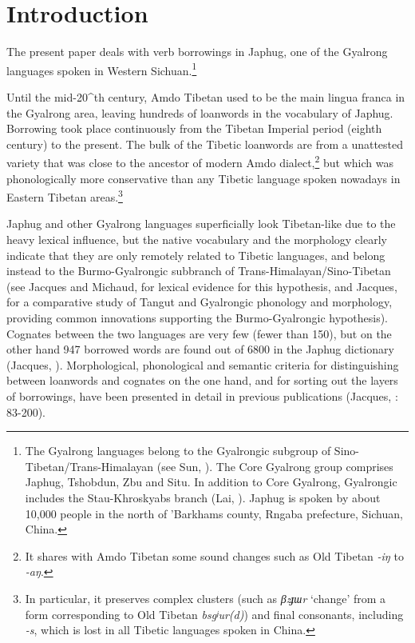 \documentclass[oneside,a4paper,11pt]{article}
\newcommand{\ipa}[1]{{\phon\textit{\mbox{#1}}}} %
\begin{document}
\section{Introduction}
The present paper deals with verb borrowings in Japhug, one of the Gyalrong languages spoken in Western Sichuan.\footnote{The Gyalrong languages belong to the Gyalrongic subgroup of Sino-Tibetan/Trans-Himalayan (see Sun, \citeyear{jackson00puxi}). The Core Gyalrong group comprises Japhug, Tshobdun, Zbu and Situ. In addition to Core Gyalrong, Gyalrongic includes the Stau-Khroskyabs branch (Lai, \citeyear{lai15person}). Japhug is spoken by about 10,000 people in the north of 'Barkhams county, Rngaba prefecture, Sichuan, China. } 

Until the mid-20^{th} century, Amdo Tibetan used to be the main lingua franca in the Gyalrong area, leaving hundreds of loanwords in the vocabulary of Japhug. Borrowing took place continuously from the Tibetan Imperial period (eighth century) to the present. The bulk of the Tibetic loanwords are from a unattested variety that was close to the ancestor of modern Amdo dialect,\footnote{It shares with Amdo Tibetan some sound changes such as Old Tibetan \ipa{-iŋ} to \ipa{-aŋ}. } but which was phonologically more conservative than any Tibetic language spoken nowadays in Eastern Tibetan areas.\footnote{In particular, it preserves complex clusters (such as \ipa{βzɟɯr} `change' from a form corresponding to Old Tibetan \ipa{bsgʲur(d)}) and final consonants, including \ipa{-s}, which is lost in all Tibetic languages spoken in China.} 

Japhug and other Gyalrong languages superficially look Tibetan-like due to the heavy lexical influence, but the native vocabulary and the morphology clearly indicate that they are only remotely related to Tibetic languages, and belong instead to the Burmo-Gyalrongic subbranch of Trans-Himalayan/Sino-Tibetan (see Jacques and Michaud, \citeyear{jacques.michaud11naish} for lexical evidence for this hypothesis, and Jacques, \citeyear{jacques14esquisse} for a comparative study of Tangut and Gyalrongic phonology and morphology, providing common innovations supporting the Burmo-Gyalrongic hypothesis). Cognates between the two languages are very few (fewer than 150), but on the other hand 947 borrowed words are found out of 6800 in the Japhug dictionary (Jacques, \citeyear{jacques15japhug}). Morphological, phonological and semantic criteria for distinguishing between loanwords and cognates on the one hand, and for sorting out the layers of borrowings, have been presented in detail in previous publications (Jacques, \citeyear{jacques04these}: 83-200). 
\end{document}

